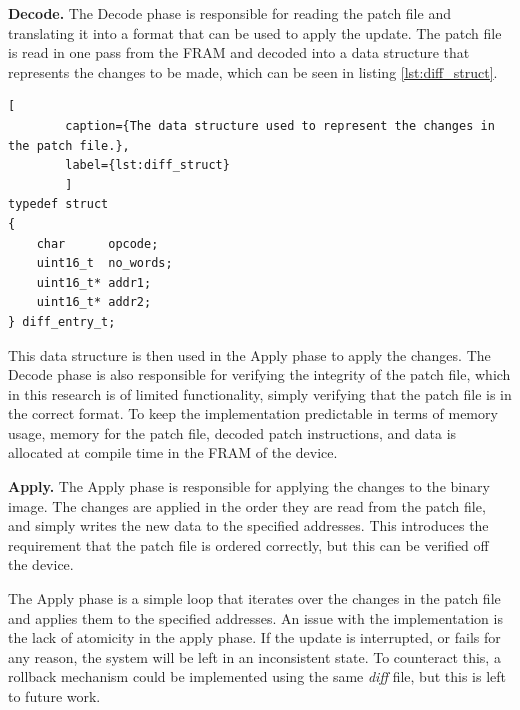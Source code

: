 \textbf{Decode.}
The Decode phase is responsible for reading the patch file and translating it into a format that can be used to apply the update. The patch file is read in one pass from the FRAM and decoded into a data structure that represents the changes to be made, which can be seen in listing \ref{lst:diff_struct}. 
\begin{framed}
    \begin{lstlisting}[
        caption={The data structure used to represent the changes in the patch file.},
        label={lst:diff_struct}
        ]
typedef struct  
{
    char      opcode;
    uint16_t  no_words;
    uint16_t* addr1;
    uint16_t* addr2;
} diff_entry_t;
    \end{lstlisting}
\end{framed}
This data structure is then used in the Apply phase to apply the changes. The Decode phase is also responsible for verifying the integrity of the patch file, which in this research is of limited functionality, simply verifying that the patch file is in the correct format. To keep the implementation predictable in terms of memory usage, memory for the patch file, decoded patch instructions, and data is allocated at compile time in the FRAM of the device.

\textbf{Apply.}
The Apply phase is responsible for applying the changes to the binary image. The changes are applied in the order they are read from the patch file, and simply writes the new data to the specified addresses. This introduces the requirement that the patch file is ordered correctly, but this can be verified off the device. 

The Apply phase is a simple loop that iterates over the changes in the patch file and applies them to the specified addresses. An issue with the implementation is the lack of atomicity in the apply phase. If the update is interrupted, or fails for any reason, the system will be left in an inconsistent state. To counteract this, a rollback mechanism could be implemented using the same \textit{diff} file, but this is left to future work.

